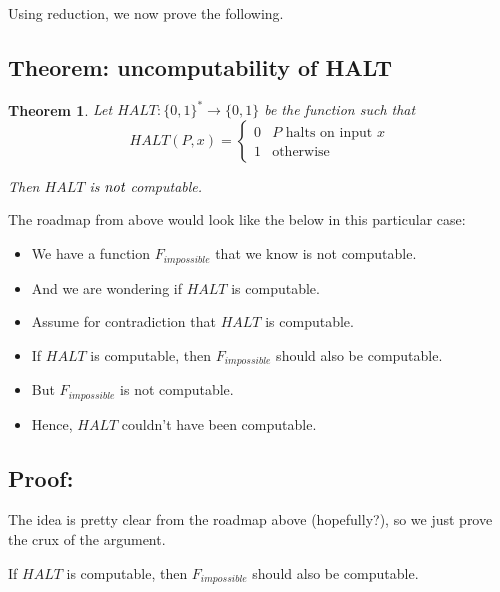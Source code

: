 \documentclass[11pt]{article}
\newtheorem{theorem}{Theorem}
\theoremstyle{definition}
\theoremstyle{remark}
\begin{document}
Using reduction, we now prove the following.

\subsection{Theorem: uncomputability of HALT}

\begin{theorem}
    Let $HALT: \{0, 1\}^* \rightarrow \{0, 1\}$ be the function such that
    \begin{equation*}
        HALT(P, x) = \begin{cases}
            0 & \text{$P$ halts on input $x$} \\
            1 & \text{otherwise}
        \end{cases}
    \end{equation*}

    Then $HALT$ is $\emph{not}$ computable.
\end{theorem}

The roadmap from above would look like the below in this particular case:

\begin{itemize}
    \item{
            We have a function $F_{impossible}$ that we know is not computable.
        }
    \item{
            And we are wondering if $HALT$ is computable.
        }
    \item{
            Assume for contradiction that $HALT$ is computable.
        }
    \item{
            If $HALT$ is computable, then $F_{impossible}$ should also be computable.
        }
    \item{
            But $F_{impossible}$ is not computable.
        }
    \item{
            Hence, $HALT$ couldn't have been computable.
        }
\end{itemize}

\subsection{Proof:}

\proof The idea is pretty clear from the roadmap above (hopefully?), so we just prove the crux of the argument.

\begin{center}
     If $HALT$ is computable, then $F_{impossible}$ should also be computable.
 \end{center}
 
\end{document}

